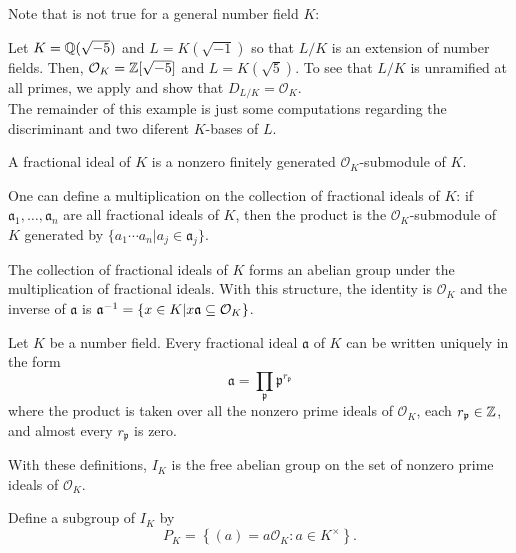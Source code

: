 Note that  is not true for a general number field $K$:

\begin{example}
    Let $K = \mathbb{Q}(\sqrt{-5})$ and $L = K(\sqrt{-1})$ so that $L/K$ is an extension of number fields. Then, $\mathcal{O}_{K} = \mathbb{Z}[\sqrt{-5}]$ and $L = K(\sqrt{5})$. To see that $L/K$ is unramified at all primes, we apply  and show that $D_{L/K} = \mathcal{O}_{K}$.\\

    The remainder of this example is just some computations regarding the discriminant and two diferent $K$-bases of $L$.
\end{example}

\begin{definition}
    A fractional ideal of $K$ is a nonzero finitely generated $\mathcal{O}_{K}$-submodule of $K$.
\end{definition}

One can define a multiplication on the collection of fractional ideals of $K$: if $\mathfrak{a}_1, \ldots, \mathfrak{a}_n$ are all fractional ideals of $K$, then the product is the $\mathcal{O}_{K}$-submodule of $K$ generated by $\{a_1\cdots a_n | a_j \in \mathfrak{a}_j\}$.

\begin{proposition}
    The collection of fractional ideals of $K$ forms an abelian group under the multiplication of fractional ideals.
    With this structure, the identity is $\mathcal{O}_{K}$ and the inverse of $\mathfrak{a}$ is $\mathfrak{a}^{-1} = \{x \in K| x \mathfrak{a} \subseteq \mathcal{O}_{K}\}$.
\end{proposition}

\begin{proposition}
    Let $K$ be a number field. Every fractional ideal $\mathfrak{a}$ of $K$ can be written uniquely in the form 
        \[\mathfrak{a} = \prod_{\mathfrak{p}} \mathfrak{p}^{r_\mathfrak{p}}\]
    where the product is taken over all the nonzero prime ideals of $\mathcal{O}_{K}$, each $r_\mathfrak{p} \in \mathbb{Z}$, and almost every $r_\mathfrak{p}$ is zero.
\end{proposition}

\begin{remark}
    With these definitions, $I_K$ is the free abelian group on the set of nonzero prime ideals of $\mathcal{O}_{K}$.
\end{remark}

Define a subgroup of $I_K$ by
    \[P_K = \left\{ (a) = a \mathcal{O}_{K}: a \in K^\times \right\}.\]

